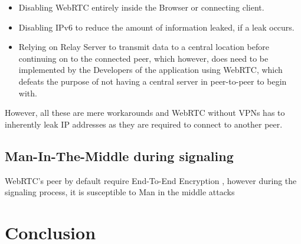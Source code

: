 \documentclass[conference]{IEEEtran}
\begin{document}
\begin{itemize}
    \item Disabling WebRTC entirely inside the Browser or connecting client.
    \item Disabling IPv6 to reduce the amount of information leaked, if a leak occurs.
    \item Relying on Relay Server to transmit data to a central location before continuing on to the connected peer,
    which however, does need to be implemented by the Developers of the application using WebRTC, which defeats the
    purpose of not having a central server in peer-to-peer to begin with.
\end{itemize}\cite{One_leak_will_sink_a_ship}
However, all these are mere workarounds and WebRTC without VPNs has to inherently leak
IP addresses as they are required to connect to another peer.

\subsection{Man-In-The-Middle during signaling}
WebRTC's peer by default require End-To-End Encryption \cite{RFC8827}, however during the signaling process,
it is susceptible to Man in the middle attacks \cite{Security_Mechanisms_for_Signaling}

\section{Conclusion}

\printbibliography{}
\end{document}
